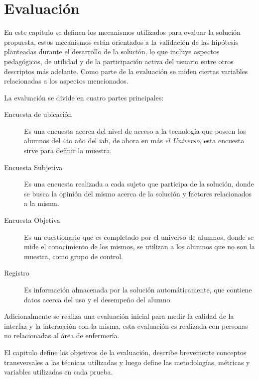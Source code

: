 
\chapter{Evaluación}
\label{chap:evaluacion}


En este capitulo se definen los mecanismos utilizados para evaluar la solución
propuesta, estos mecanismos están orientados a la validación de las hipótesis
planteadas durante el desarrollo de la solución, lo que incluye aspectos
pedagógicos, de utilidad y de la participación activa del usuario entre otros
descriptos más adelante. Como parte de la evaluación se miden ciertas variables
relacionadas a los aspectos mencionados.

La evaluación se divide en cuatro partes principales:

\begin{description}
    \item[Encuesta de ubicación] Es una encuesta acerca del nivel de acceso a la
        tecnología que poseen los alumnos del 4to año del \Gls{iab}, de ahora en
        más \textit{el Universo}, esta encuesta sirve para definir la muestra.

    \item[Encuesta Subjetiva] Es una encuesta realizada a cada sujeto que
        participa de la solución, donde se busca la opinión del mismo acerca de
        la solución y factores relacionados a la misma. 

    \item[Encuesta Objetiva] Es un cuestionario que es completado por el
        universo de alumnos, donde se mide el conocimiento de los mismos, se
        utilizan a los alumnos que no son la muestra, como   grupo de control.

    \item[Registro] Es información almacenada por la solución automáticamente,
        que contiene datos acerca del uso y el desempeño del alumno.
\end{description}


Adicionalmente se realiza una evaluación inicial para medir la calidad de la
interfaz y la interacción con la misma, esta evaluación es realizada con
personas no relacionadas al área de enfermería.

El capitulo define los objetivos de la evaluación, describe brevemente conceptos
transversales a las técnicas utilizadas y luego define las metodologías,
métricas y variables utilizadas en cada prueba.








